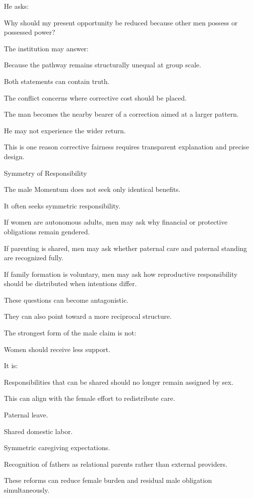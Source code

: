 He asks:

Why should my present opportunity be reduced because other men possess or possessed power?

The institution may answer:

Because the pathway remains structurally unequal at group scale.

Both statements can contain truth.

The conflict concerns where corrective cost should be placed.

The man becomes the nearby bearer of a correction aimed at a larger pattern.

He may not experience the wider return.

This is one reason corrective fairness requires transparent explanation and precise design.

Symmetry of Responsibility

The male Momentum does not seek only identical benefits.

It often seeks symmetric responsibility.

If women are autonomous adults, men may ask why financial or protective obligations remain gendered.

If parenting is shared, men may ask whether paternal care and paternal standing are recognized fully.

If family formation is voluntary, men may ask how reproductive responsibility should be distributed when intentions differ.

These questions can become antagonistic.

They can also point toward a more reciprocal structure.

The strongest form of the male claim is not:

Women should receive less support.

It is:

Responsibilities that can be shared should no longer remain assigned by sex.

This can align with the female effort to redistribute care.

Paternal leave.

Shared domestic labor.

Symmetric caregiving expectations.

Recognition of fathers as relational parents rather than external providers.

These reforms can reduce female burden and residual male obligation simultaneously.

